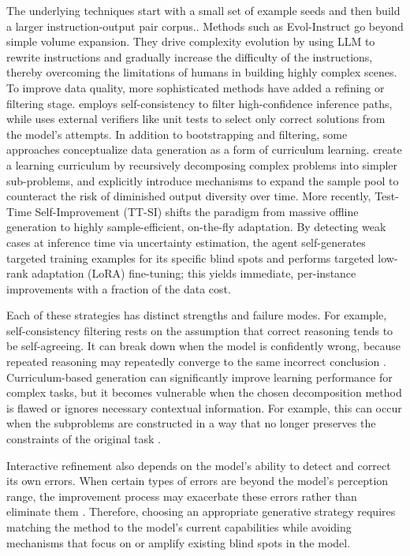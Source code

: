 \documentclass{article}
\begin{document}
The underlying techniques start with a small set of example seeds and then build a larger instruction-output pair corpus.\citep{wang2022self, zhao2024selfguidebettertaskspecificinstruction}. Methods such as Evol-Instruct \citep{xu2024wizardlm} go beyond simple volume expansion. They drive complexity evolution by using LLM to rewrite instructions and gradually increase the difficulty of the instructions, thereby overcoming the limitations of humans in building highly complex scenes. To improve data quality, more sophisticated methods have added a refining or filtering stage.  \cite{huang2023large} employs self-consistency to filter high-confidence inference paths, while \cite{singh2023beyond} uses external verifiers like unit tests to select only correct solutions from the model’s attempts. In addition to bootstrapping and filtering, some approaches conceptualize data generation as a form of curriculum learning. \cite{simonds2025ladder} create a learning curriculum by recursively decomposing complex problems into simpler sub-problems, and \cite{qin2025dive} explicitly introduce mechanisms to expand the sample pool to counteract the risk of diminished output diversity over time. More recently, Test-Time Self-Improvement (TT-SI) \citep{acikgoz2025selfimprovingllmagentstesttime} shifts the paradigm from massive offline generation to highly sample-efficient, on-the-fly adaptation. By detecting weak cases at inference time via uncertainty estimation, the agent self-generates targeted training examples for its specific blind spots and performs targeted low-rank adaptation (LoRA) fine-tuning; this yields immediate, per-instance improvements with a fraction of the data cost.

Each of these strategies has distinct strengths and failure modes. For example, self-consistency filtering rests on the assumption that correct reasoning tends to be self-agreeing. It can break down when the model is confidently wrong, because repeated reasoning may repeatedly converge to the same incorrect conclusion \citep{chen2024failuresselfconsistencymultistepreasoning, anonymous2025complementing}. 
Curriculum-based generation can significantly improve learning performance for complex tasks, but it becomes vulnerable when the chosen decomposition method is flawed or ignores necessary contextual information. For example, this can occur when the subproblems are constructed in a way that no longer preserves the constraints of the original task \citep{zhou2023leasttomost, xu2024wizardlm}.

Interactive refinement also depends on the model's ability to detect and correct its own errors. When certain types of errors are beyond the model's perception range, the improvement process may exacerbate these errors rather than eliminate them \citep{shinn2023reflexionlanguageagentsverbal, huang2024largelanguagemodelsselfcorrect}. Therefore, choosing an appropriate generative strategy requires matching the method to the model's current capabilities while avoiding mechanisms that focus on or amplify existing blind spots in the model.
\end{document}
